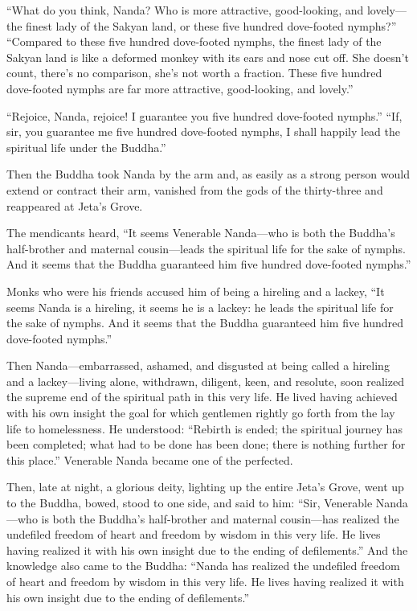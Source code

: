 \documentclass[12pt,openany]{book}%
\begin{document}
“What do you think, Nanda? Who is more attractive, good-looking, and lovely—the finest lady of the Sakyan land, or these five hundred dove-footed nymphs?” “Compared to these five hundred dove-footed nymphs, the finest lady of the Sakyan land is like a deformed monkey with its ears and nose cut off. She doesn’t count, there’s no comparison, she’s not worth a fraction. These five hundred dove-footed nymphs are far more attractive, good-looking, and lovely.” 

“Rejoice, Nanda, rejoice! I guarantee you five hundred dove-footed nymphs.” “If, sir, you guarantee me five hundred dove-footed nymphs, I shall happily lead the spiritual life under the Buddha.” 

Then the Buddha took Nanda by the arm and, as easily as a strong person would extend or contract their arm, vanished from the gods of the thirty-three and reappeared at Jeta’s Grove. 

The mendicants heard, “It seems Venerable Nanda—who is both the Buddha’s half-brother and maternal cousin—leads the spiritual life for the sake of nymphs. And it seems that the Buddha guaranteed him five hundred dove-footed nymphs.” 

Monks who were his friends accused him of being a hireling and a lackey, “It seems Nanda is a hireling, it seems he is a lackey: he leads the spiritual life for the sake of nymphs. And it seems that the Buddha guaranteed him five hundred dove-footed nymphs.” 

Then Nanda—embarrassed, ashamed, and disgusted at being called a hireling and a lackey—living alone, withdrawn, diligent, keen, and resolute, soon realized the supreme end of the spiritual path in this very life. He lived having achieved with his own insight the goal for which gentlemen rightly go forth from the lay life to homelessness. He understood: “Rebirth is ended; the spiritual journey has been completed; what had to be done has been done; there is nothing further for this place.” Venerable Nanda became one of the perfected. 

Then, late at night, a glorious deity, lighting up the entire Jeta’s Grove, went up to the Buddha, bowed, stood to one side, and said to him: “Sir, Venerable Nanda—who is both the Buddha’s half-brother and maternal cousin—has realized the undefiled freedom of heart and freedom by wisdom in this very life. He lives having realized it with his own insight due to the ending of defilements.” And the knowledge also came to the Buddha: “Nanda has realized the undefiled freedom of heart and freedom by wisdom in this very life. He lives having realized it with his own insight due to the ending of defilements.” 
\end{document}
